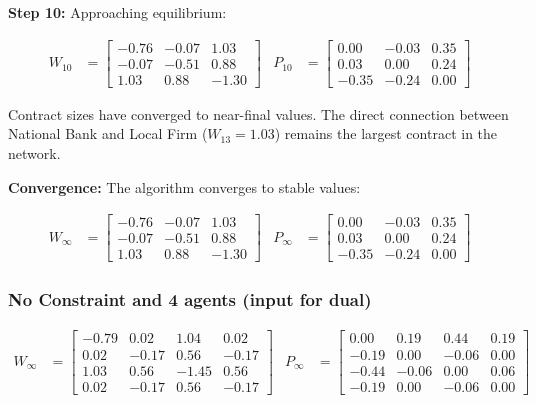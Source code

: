 \textbf{Step 10:} Approaching equilibrium:

\begin{align}
    W_{10} &= \begin{bmatrix} 
        -0.76 & -0.07 & 1.03 \\ 
        -0.07 & -0.51 & 0.88 \\ 
        1.03 & 0.88 & -1.30 
    \end{bmatrix} &
    P_{10} &= \begin{bmatrix} 
        0.00 & -0.03 & 0.35 \\ 
        0.03 & 0.00 & 0.24 \\ 
        -0.35 & -0.24 & 0.00 
    \end{bmatrix}
\end{align}

Contract sizes have converged to near-final values. The direct connection between National Bank and Local Firm ($W_{13} = 1.03$) remains the largest contract in the network.

\textbf{Convergence:} The algorithm converges to stable values:

\begin{align}
    W_\infty &= \begin{bmatrix} 
        -0.76 & -0.07 & 1.03 \\ 
        -0.07 & -0.51 & 0.88 \\ 
        1.03 & 0.88 & -1.30 
    \end{bmatrix} &
    P_\infty &= \begin{bmatrix} 
        0.00 & -0.03 & 0.35 \\ 
        0.03 & 0.00 & 0.24 \\ 
        -0.35 & -0.24 & 0.00 
    \end{bmatrix}
\end{align}




\subsubsection{No Constraint and 4 agents (input for dual)}
\label{app:optimalw}
\begin{align} 
    W_\infty &= \begin{bmatrix} 
        -0.79 & 0.02 & 1.04 & 0.02 \\ 
        0.02 & -0.17 & 0.56 & -0.17\\ 
        1.03 & 0.56 & -1.45 & 0.56\\
        0.02 & -0.17 & 0.56 & -0.17
    \end{bmatrix} & 
    P_\infty &= \begin{bmatrix} 
        0.00 & 0.19 & 0.44 & 0.19 \\ 
        -0.19 & 0.00 & -0.06 & 0.00 \\ 
        -0.44 & -0.06 & 0.00 & 0.06\\
        -0.19 & 0.00 & -0.06 & 0.00
    \end{bmatrix}
\end{align}
